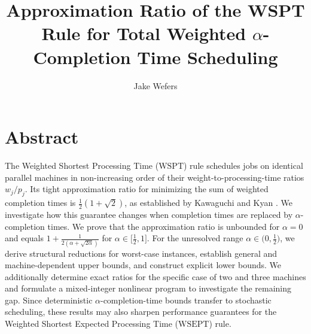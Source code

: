 \documentclass[%
english, titlepage=false %
]{./tum-templates/book/tumbook}
\title{Approximation Ratio of the WSPT Rule for Total Weighted \texorpdfstring{$\alpha$}{alpha}-Completion Time Scheduling}
\subtitle{}
\author{Jake Wefers}
\begin{document}
\raggedbottom

\frontmatter
\maketitle


\section*{Abstract}
The Weighted Shortest Processing Time ($\mathrm{WSPT}$) rule schedules jobs on 
identical parallel machines in non-increasing order of their weight-to-processing-time
ratios $w_j/p_j$. Its tight approximation ratio for minimizing the sum of weighted completion
times is $\frac{1}{2}(1+\sqrt{2})$, as established by Kawaguchi and Kyan \cite{KawaguchiKyan:1988}.
We investigate how this guarantee changes when completion times are replaced
by $\alpha$-completion times. We prove that
the approximation ratio is unbounded for $\alpha=0$ and equals
$1+\frac{1}{2(\alpha+\sqrt{2\alpha})}$ for
$\alpha\in\Big[\frac{1}{2},1\Big]$. For the unresolved range
$\alpha\in \Big(0,\frac{1}{2}\Big)$, we derive structural reductions for
worst-case instances, establish general and machine-dependent upper
bounds, and construct explicit lower bounds. We additionally determine
exact ratios for the specific case of two and three machines and formulate a mixed-integer
nonlinear program to investigate the remaining gap. Since deterministic
$\alpha$-completion-time bounds transfer to stochastic scheduling, these
results may also sharpen performance guarantees for the Weighted
Shortest Expected Processing Time ($\mathrm{WSEPT}$) rule.
\end{document}
